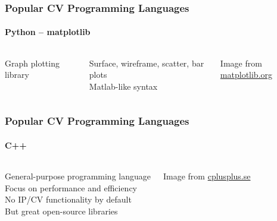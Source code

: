 \documentclass[xetex,professionalfont]{beamer}
\begin{document}

\begin{frame}
\frametitle{Popular CV Programming Languages}
\framesubtitle{Python -- matplotlib}

\begin{columns}

Graph plotting library

\bigskip
Surface, wireframe, scatter, bar plots\\\medskip
Matlab-like syntax


\begin{center}
{
	{\centering Image from \url{matplotlib.org}}}
\end{center}

\end{columns}

\end{frame}


\begin{frame}
\frametitle{Popular CV Programming Languages}
\framesubtitle{C++}

\begin{columns}

General-purpose programming language\\\medskip
Focus on performance and efficiency\\\medskip
No IP/CV functionality by default\\\medskip
But great open-source libraries


\begin{center}
{
	{\centering Image from \url{cplusplus.se}}}
\end{center}

\end{columns}

\end{frame}
\end{document}
